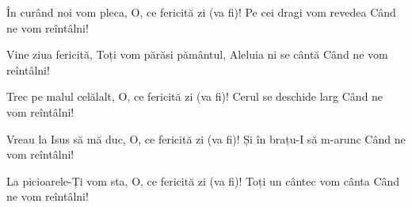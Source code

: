 \beginverse
În curând noi vom pleca,
O, ce fericită zi (va fi)!
Pe cei dragi vom revedea
Când ne vom reîntâlni!
\endverse

\beginchorus
Vine ziua fericită,
Toți vom părăsi pământul,
Aleluia ni se cântă
Când ne vom reîntâlni!
\endchorus

\beginverse
Trec pe malul celălalt,
O, ce fericită zi (va fi)!
Cerul se deschide larg
Când ne vom reîntâlni!
\endverse

\beginverse
Vreau la Isus să mă duc,
O, ce fericită zi (va fi)!
Și în brațu-I să m-arunc
Când ne vom reîntâlni!
\endverse

\beginverse
La picioarele-Ți vom sta,
O, ce fericită zi (va fi)!
Toți un cântec vom cânta
Când ne vom reîntâlni!
\endverse
\endsong